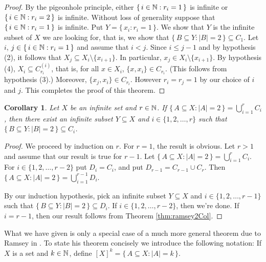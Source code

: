 \documentclass[12pt]{article}
\theoremstyle{plain}
\newtheorem{cor}[thm]{Corollary}
\begin{document}
\begin{proof}
  By the pigeonhole principle, either $\{\, i \in \mathbb{N} : r_i = 1 \,\}$
  is infinite or $\{\, i \in \mathbb{N} : r_i = 2 \,\}$ is infinite.
  Without loss of generality suppose that $\{\, i \in \mathbb{N} : r_i =
  1\,\}$ is infinite.
  Put $Y = \{\, x_i : r_i = 1 \,\}$.
  We show that $Y$ is the infinite subset of $X$ we are looking for,
  that is, we show that $\{\, B \subseteq Y : |B| = 2 \,\} \subseteq
  C_1$.  
  Let $i$, $j \in \{\, i \in \mathbb{N} : r_i = 1 \,\}$ and assume that $i <
  j$.
  Since $i \le j-1$ and by hypothesis (2), it follows that $X_j
  \subseteq X_{i} \setminus \{x_{i+1}\}$. 
  In particular, $x_j \in X_i \setminus \{x_{i+1}\}$.
  By hypothesis (4), $X_i \subseteq C_{r_i}^{(i)}$, that is, for all
  $x \in X_i$, $\{x, x_i\} \in C_{r_i}$. 
  (This follows from hypothesis (3).)
  Moreover, $\{x_j, x_i\} \in C_{r_i}$. 
  However $r_i = r_j = 1$ by our choice of $i$ and $j$.
  This completes the proof of this theorem.
\end{proof}
\begin{cor}
  \label{cor:ramseyrCol}
  Let $X$ be an infinite set and $r \in \mathbb{N}$.
  If $\{\, A \subseteq X : |A| = 2 \,\} = \bigcup_{i=1}^r C_i$, then
  there exist an infinite subset $Y \subseteq X$ and $i \in \{1, 2,
  \ldots, r\}$ such that $\{\, B \subseteq Y : |B| = 2 \,\} \subseteq
  C_i$.
\end{cor}
\begin{proof}
  We proceed by induction on $r$.
  For $r = 1$, the result is obvious.
  Let $r > 1$ and assume that our result is true for $r-1$.
  Let $\{\, A \subseteq X : |A| = 2 \,\} = \bigcup_{i=1}^r C_i$.
  For $i \in \{1, 2, \ldots, r-2\}$ put $D_i = C_i$, and put $D_{r-1}
  = C_{r-1} \cup C_r$.
  Then $\{\, A \subseteq X : |A| = 2 \,\} = \bigcup_{i=1}^{r-1} D_i$. 
  
  By our induction hypothesis, pick an infinite subset $Y \subseteq
  X$ and  $i \in \{1, 2, \ldots, r-1\}$ such that $\{\, B \subseteq Y
  : |B| = 2 \,\} \subseteq D_i$.
  If $i \in \{1, 2, \ldots, r-2\}$, then we're done.
  If $i = r-1$, then our result follows from Theorem
  \ref{thm:ramsey2Col}.
\end{proof}

What we have given is only a special case of a much more general
theorem due to Ramsey in \cite[Theorem A]{Ramsey:1930uq}.
To state his theorem concisely we introduce the following notation: If
$X$ is a set and $k \in \mathbb{N}$, define $[X]^k = \{\, A \subseteq X :
|A| = k \,\}$.
\end{document}
